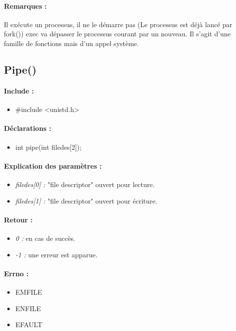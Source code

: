 \documentclass{article}[12pt]
\begin{document}
\paragraph{Remarques : }
Il exécute un processus, il ne le démarre pas (Le processus est déjà lancé par fork()) exec va dépasser le processus courant par un nouveau. Il s'agit d'une famille de fonctions mais d'un appel système. 
\subsection{Pipe()}
\paragraph{Include : }
\begin{itemize}
	\item \#include <unistd.h>
\end{itemize}
\paragraph{Déclarations : }
\begin{itemize}
	\item int pipe(int filedes[2]);
\end{itemize}
\paragraph{Explication des paramètres : }
\begin{itemize}
	\item \emph{filedes[0] : } "file descriptor" ouvert pour lecture.
    \item \emph{filedes[1] : } "file descriptor" ouvert pour écriture.
\end{itemize}
\paragraph{Retour : }
\begin{itemize}
	\item \emph{0 : } en cas de succès.
	\item \emph{-1 : } une erreur est apparue.
\end{itemize}
\paragraph{Errno :}
\begin{itemize}
	\item EMFILE
    \item ENFILE
    \item EFAULT
\end{itemize}
\end{document}
